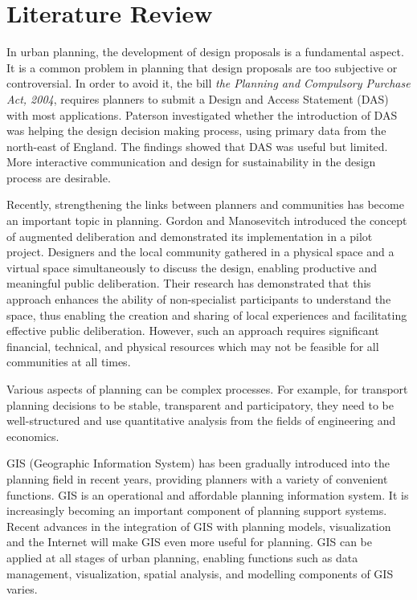 \section*{Literature Review}
In urban planning, the development of design proposals is a fundamental aspect. It is a common problem in planning that design proposals are too subjective or controversial. In order to avoid it, the bill \textit{the Planning and Compulsory Purchase Act, 2004}, requires planners to submit a Design and Access Statement (DAS) with most applications. Paterson\cite{bib4} investigated whether the introduction of DAS was helping the design decision making process, using primary data from the north-east of England. The findings showed that DAS was useful but limited. More interactive communication and design for sustainability in the design process are desirable.

Recently, strengthening the links between planners and communities has become an important topic in planning. Gordon and Manosevitch\cite{bib5} introduced the concept of augmented deliberation and demonstrated its implementation in a pilot project. Designers and the local community gathered in a physical space and a virtual space simultaneously to discuss the design, enabling productive and meaningful public deliberation. Their research has demonstrated that this approach enhances the ability of non-specialist participants to understand the space, thus enabling the creation and sharing of local experiences and facilitating effective public deliberation. However, such an approach requires significant financial, technical, and physical resources which may not be feasible for all communities at all times.

Various aspects of planning can be complex processes. For example, for transport planning decisions to be stable, transparent and participatory, they need to be well-structured and use quantitative analysis from the fields of engineering and economics.\cite{bib6}

GIS (Geographic Information System) has been gradually introduced into the planning field in recent years, providing planners with a variety of convenient functions.\cite{bib7} GIS is an operational and affordable planning information system. It is increasingly becoming an important component of planning support systems. Recent advances in the integration of GIS with planning models, visualization and the Internet will make GIS even more useful for planning. GIS can be applied at all stages of urban planning, enabling functions such as data management, visualization, spatial analysis, and modelling components of GIS varies.

